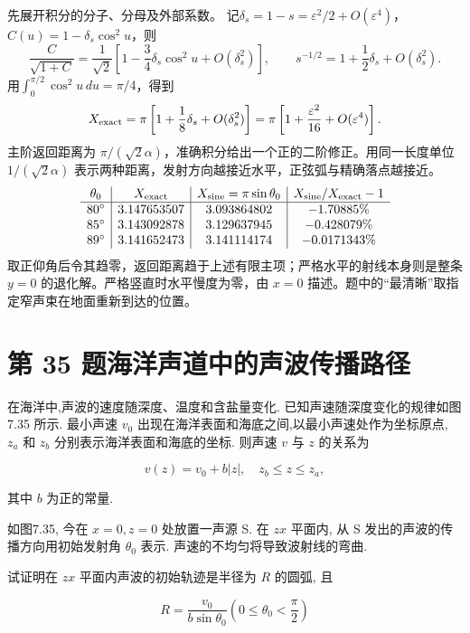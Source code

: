 \documentclass[UTF8,fontset=fandol,a4paper,11pt]{ctexart}
\newcommand{\tagline}[1]{\noindent{\small\color{muted}#1}\par}
\begin{document}
先展开积分的分子、分母及外部系数。
记$\delta_s=1-s=\varepsilon^2/2+O(\varepsilon^4)$，
$C(u)=1-\delta_s\cos^2u$，则
\[
\frac{C}{\sqrt{1+C}}=\frac1{\sqrt2}
\left[1-\frac34\delta_s\cos^2u+O(\delta_s^2)\right],
\qquad s^{-1/2}=1+\frac12\delta_s+O(\delta_s^2).
\]
用$\int_0^{\pi/2}\cos^2u\,du=\pi/4$，得到
\[
X_{\rm exact}=\pi\left[1+\frac18\delta_s+O(\delta_s^2)\right]
=\pi\left[1+\frac{\varepsilon^2}{16}+O(\varepsilon^4)\right].
\]
主阶返回距离为 $\pi/(\sqrt2\alpha)$，准确积分给出一个正的二阶修正。用同一长度单位 $1/(\sqrt2\alpha)$ 表示两种距离，发射方向越接近水平，正弦弧与精确落点越接近。
\[
\begin{array}{c|c|c|c}
\theta_0&X_{\rm exact}&X_{\rm sine}=\pi\sin\theta_0
&X_{\rm sine}/X_{\rm exact}-1\\ \hline
80^\circ&3.147653507&3.093864802&-1.70885\%\\
85^\circ&3.143092878&3.129637945&-0.428079\%\\
89^\circ&3.141652473&3.141114174&-0.0171343\%
\end{array}
\]
取正仰角后令其趋零，返回距离趋于上述有限主项；严格水平的射线本身则是整条 $y=0$ 的退化解。严格竖直时水平慢度为零，由 $x=0$ 描述。题中的“最清晰”取指定窄声束在地面重新到达的位置。




\section*{第 35 题\quad 海洋声道中的声波传播路径}

\tagline{M-07-35}

在海洋中,声波的速度随深度、温度和含盐量变化.
已知声速随深度变化的规律如图7.35 所示. 最小声速 \(v_{0}\)
出现在海洋表面和海底之间,以最小声速处作为坐标原点, \(z_{a}\) 和
\(z_{b}\) 分别表示海洋表面和海底的坐标. 则声速 \(v\) 与 \(z\) 的关系为

\[v(z)=v_0+b|z|,\quad z_b\le z\le z_a,\]

其中 \(b\) 为正的常量.

如图7.35, 今在 \(x=0, z=0\) 处放置一声源 S. 在 \(zx\) 平面内, 从 S
发出的声波的传播方向用初始发射角 \(\theta_0\) 表示.
声速的不均匀将导致波射线的弯曲.

试证明在 \(zx\) 平面内声波的初始轨迹是半径为 \(R\) 的圆弧, 且

\[
R=\frac{v_{0}}{b\sin\theta_{0}}\left(0\leqslant\theta_{0}<\frac{\pi}{2}\right)
\]
\end{document}

